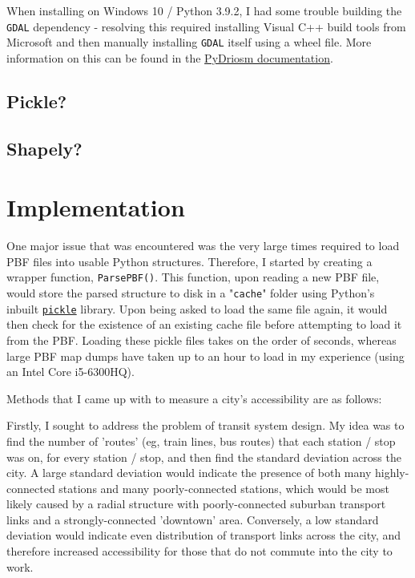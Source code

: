 \documentclass[11pt]{article} %
\begin{document}
When installing on Windows 10 / Python 3.9.2, I had some trouble building the \texttt{GDAL} dependency - resolving this required installing Visual C++ build tools from Microsoft and then manually installing \texttt{GDAL} itself using a wheel file. More information on this can be found in the \href{https://pydriosm.readthedocs.io/en/latest/installation.html}{PyDriosm documentation}.

\subsection{Pickle?}

\subsection{Shapely?}


\section{Implementation}
One major issue that was encountered was the very large times required to load PBF files into usable Python structures. Therefore, I started by creating a wrapper function, \texttt{ParsePBF()}. This function, upon reading a new PBF file, would store the parsed structure to disk in a "\texttt{cache}" folder using Python's inbuilt \href{https://docs.python.org/3/library/pickle.html}{\texttt{pickle}} library. Upon being asked to load the same file again, it would then check for the existence of an existing cache file before attempting to load it from the PBF. Loading these pickle files takes on the order of seconds, whereas large PBF map dumps have taken up to an hour to load in my experience (using an Intel Core i5-6300HQ).

Methods that I came up with to measure a city's accessibility are as follows:

Firstly, I sought to address the problem of transit system design. My idea was to find the number of 'routes' (eg, train lines, bus routes) that each station / stop was on, for every station / stop, and then find the standard deviation across the city. A large standard deviation would indicate the presence of both many highly-connected stations and many poorly-connected stations, which would be most likely caused by a radial structure with poorly-connected suburban transport links and a strongly-connected 'downtown' area. Conversely, a low standard deviation would indicate even distribution of transport links across the city, and therefore increased accessibility for those that do not commute into the city to work.
\end{document}
